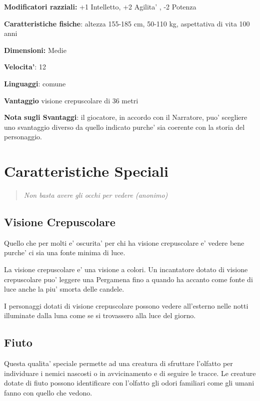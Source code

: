 \documentclass[a4paper,11pt,twoside,openany]{book}
\begin{document}
\textbf{Modificatori razziali:} +1 Intelletto, +2 Agilita' , -2 Potenza

\textbf{Caratteristiche fisiche}: altezza 155-185 cm, 50-110 kg, aspettativa
di vita 100 anni

\textbf{Dimensioni:} Medie

\textbf{Velocita'}: 12

\textbf{Linguaggi}: comune

\textbf{Vantaggio} visione crepuscolare di 36 metri

\bigskip

\textbf{Nota sugli Svantaggi}: il giocatore, in accordo con il Narratore, puo' scegliere uno svantaggio diverso da quello indicato purche' sia coerente con la storia del personaggio.


\pagebreak

\section{Caratteristiche Speciali}

\label{caratteristiche-speciali}
\begin{quote}\textit{Non basta avere gli occhi per vedere (anonimo)
}\end{quote}

\subsection{Visione Crepuscolare}

Quello che per molti e’ oscurita’ per chi ha visione crepuscolare e’ vedere bene purche’ ci sia una fonte minima di luce.

La visione crepuscolare e' una visione a colori.
Un incantatore dotato di visione crepuscolare puo' leggere una Pergamena fino a quando ha accanto come fonte di luce anche la piu' smorta delle candele.

I personaggi dotati di visione crepuscolare possono vedere all’esterno nelle notti illuminate dalla luna come se si trovassero alla luce del giorno.

\subsection{Fiuto}

Questa qualita’ speciale permette ad una creatura di sfruttare l'olfatto per individuare i nemici nascosti o in avvicinamento e di seguire le tracce. Le creature dotate di fiuto possono identificare con l'olfatto gli odori familiari come gli umani fanno con quello che vedono.
\end{document}
